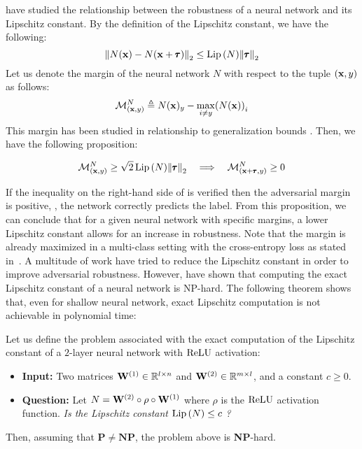 \citet{tsuzuku2018lipschitz} have studied the relationship between the robustness of a neural network and its Lipschitz constant. 
By the definition of the Lipschitz constant, we have the following:
\begin{equation}
  \norm{N(\mathbf{x}) - N(\mathbf{x} + \pmb{\tau})}_2 \leq \operatorname{Lip}{(N)} \norm{\pmb{\tau}}_2
\end{equation}
Let us denote the margin of the neural network $N$ with respect to the tuple $(\mathbf{x}, y)$ as follows:
\begin{equation}
  \mathcal{M}^{N}_{(\xvec, y)} \triangleq N(\xvec)_y - \max_{i \neq y} \left( N(\xvec) \right)_i
\end{equation}
This margin has been studied in relationship to generalization bounds \cite{langford2002pac,bartlett2017spectrally,neyshabur2018pacbayesian}.
Then, we have the following proposition:
\begin{proposition}
  \begin{equation} \label{equation:ch3-margin_guarded_area}
    \mathcal{M}^{N}_{(\mathbf{x}, y)} \geq \sqrt{2} \operatorname{Lip}{(N)} \norm{\pmb{\tau}}_2 \quad \Longrightarrow \quad \mathcal{M}^{N}_{(\mathbf{x} + \pmb{\tau}, y)} \geq 0
  \end{equation}
  \removespace
\end{proposition}
\noindent
If the inequality on the right-hand side of  is verified then the adversarial margin is positive, \ie, the network correctly predicts the label. 
From this proposition, we can conclude that for a given neural network with specific margins, a lower Lipschitz constant allows for an increase in robustness. 
Note that the margin is already maximized in a multi-class setting with the cross-entropy loss as stated in~\citet{hein2017formal}.
A multitude of work have tried to reduce the Lipschitz constant in order to improve adversarial robustness.
However, \citet{scaman2018lipschitz} have shown that computing the exact Lipschitz constant of a neural network is NP-hard.
The following theorem shows that, even for shallow neural network, exact Lipschitz computation is not achievable in polynomial time:
\begin{theorem} \label{theorem:ch3-lipschitz_computation}
  Let us define the problem associated with the exact computation of the Lipschitz constant of a $2$-layer neural network with $\operatorname{ReLU}$ activation:
  \begin{itemize}%
    \item[] \textbf{Input:} Two matrices $\mathbf{W}^{(1)} \in \mathbb{R}^{l \times n}$ and $\mathbf{W}^{(2)} \in \mathbb{R}^{m \times l}$, and a constant $c \geq 0$.
    \item[] \textbf{Question:} Let $N = \mathbf{W}^{(2)} \circ \rho \circ \mathbf{W}^{(1)}$ where $\rho$ is the $\operatorname{ReLU}$ activation function. \emph{Is the Lipschitz constant $\operatorname{Lip}{(N)} \leq c$ ?}
  \end{itemize}
  Then, assuming that $\mathbf{P} \neq \mathbf{NP}$, the problem above is \textbf{NP}-hard. 
\end{theorem}

